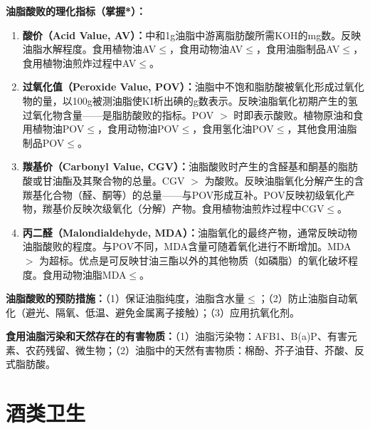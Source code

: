 \begin{keybox}
\difficulty \textbf{油脂酸败的理化指标（掌握*）：}

\begin{enumerate}[leftmargin=*]
    \item \textbf{酸价（Acid Value, AV）：}中和1g油脂中游离脂肪酸所需KOH的mg数。反映油脂水解程度。食用植物油AV$\leq$，食用动物油AV$\leq$，食用油脂制品AV$\leq$，食用植物油煎炸过程中AV$\leq$。

    \item \textbf{过氧化值（Peroxide Value, POV）：}油脂中不饱和脂肪酸被氧化形成过氧化物的量，以100g被测油脂使KI析出碘的g数表示。反映油脂氧化初期产生的氢过氧化物含量——是脂肪酸败的指标。POV $>$ 时即表示酸败。植物原油和食用植物油POV$\leq$，食用动物油POV$\leq$，食用氢化油POV$\leq$，其他食用油脂制品POV$\leq$。

    \item \textbf{羰基价（Carbonyl Value, CGV）：}油脂酸败时产生的含醛基和酮基的脂肪酸或甘油酯及其聚合物的总量。CGV $>$ 为酸败。反映油脂氧化分解产生的含羰基化合物（醛、酮等）的总量——与POV形成互补。POV反映初级氧化产物，羰基价反映次级氧化（分解）产物。食用植物油煎炸过程中CGV$\leq$。

    \item \textbf{丙二醛（Malondialdehyde, MDA）：}油脂氧化的最终产物，通常反映动物油脂酸败的程度。与POV不同，MDA含量可随着氧化进行不断增加。MDA $>$ 为超标。优点是可反映甘油三酯以外的其他物质（如磷脂）的氧化破坏程度。食用动物油脂MDA$\leq$。
\end{enumerate}

\textbf{油脂酸败的预防措施：}（1）保证油脂纯度，油脂含水量$\leq$；（2）防止油脂自动氧化（避光、隔氧、低温、避免金属离子接触）；（3）应用抗氧化剂。

\textbf{食用油脂污染和天然存在的有害物质：}（1）油脂污染物：AFB1、B(a)P、有害元素、农药残留、微生物；（2）油脂中的天然有害物质：棉酚、芥子油苷、芥酸、反式脂肪酸。
\end{keybox}

\section{酒类卫生}

